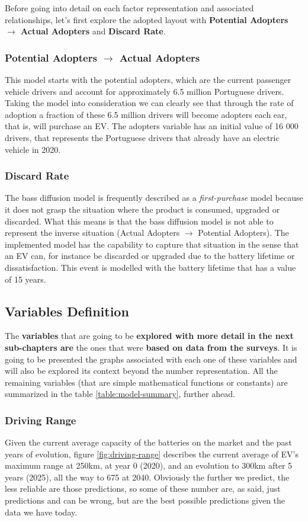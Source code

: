 \clearpage

Before going into detail on each factor representation and associated relationships, let's first explore the adopted layout with \textbf{Potential Adopters $\rightarrow$ Actual Adopters} and \textbf{Discard Rate}.

\subsubsection{Potential Adopters $\rightarrow$ Actual Adopters}
This model starts with the potential adopters, which are the current passenger vehicle drivers and account for approximately 6.5 million Portuguese drivers. Taking the model into consideration we can clearly see that through the rate of adoption a fraction of these 6.5 million drivers will become adopters each ear, that is, will purchase an EV. The adopters variable has an initial value of 16 000 drivers, that represents the Portuguese drivers that already have an electric vehicle in 2020. 

\subsubsection{Discard Rate}
The bass diffusion model is frequently described as a \textit{first-purchase} model because it does not grasp the situation where the product is consumed, upgraded or discarded. What this means is that the bass diffusion model is not able to represent the inverse situation (Actual Adopters $\rightarrow$ Potential Adopters). The implemented model has the capability to capture that situation in the sense that an EV can, for instance be discarded or upgraded due to the battery lifetime or dissatisfaction. This event is modelled with the battery lifetime that has a value of 15 years. 

\subsection{Variables Definition}
The \textbf{variables} that are going to be \textbf{explored with more detail in the next sub-chapters are} the ones that were \textbf{based on data from the surveys}. It is going to be presented the graphs associated with each one of these variables and will also be explored its context beyond the number representation. All the remaining variables (that are simple mathematical functions or constants) are summarized in the table \ref{table:model-summary}, further ahead.

\subsubsection{Driving Range}
Given the current average capacity of the batteries on the market and the past years of evolution, figure \ref{fig:driving-range} describes the current average of EV's maximum range at 250km, at year 0 (2020), and an evolution to 300km after 5 years (2025), all the way to 675 at 2040. Obviously the further we predict, the less reliable are those predictions, so some of these number are, as said, just predictions and can be wrong, but are the best possible predictions given the data we have today.

